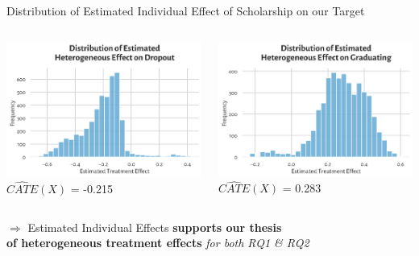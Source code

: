 \documentclass[aspectratio=169]{beamer}
\begin{document}
\begin{frame}{Distribution of Estimated Individual Effect of Scholarship on our Target}
\vspace{10pt}
\centering
\begin{columns}[t]
\begin{column}{0.5\textwidth}
\centering
	\hspace*{-0.5cm}
     \includegraphics[width=1.1\linewidth]{Tex_Pictures/Distribution_of_TE_drop_out.png}
		$\widehat{CATE}(X)$ = -0.215
\end{column}
\begin{column}{0.5\textwidth}
\centering
	\hspace*{-0.5cm}
    \includegraphics[width=1.1\linewidth]{Tex_Pictures/Distribution_TE_graduate.png}
    $\widehat{CATE}(X)$ = 0.283
\end{column}
\end{columns}

\vspace{5pt}
$\Rightarrow$ Estimated Individual Effects \textbf{supports our thesis\\of heterogeneous treatment effects} \textit{for both RQ1 \& RQ2}

 
\end{frame}
\end{document}
